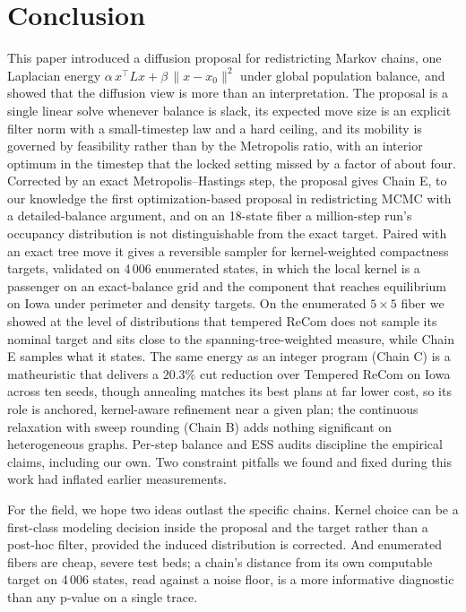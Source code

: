 \documentclass[11pt]{article}
\begin{document}
\section{Conclusion}\label{sec:conclusion}

This paper introduced a diffusion proposal for redistricting Markov
chains, one Laplacian energy
$\alpha\,x^\top L x + \beta\,\|x - x_0\|^2$ under global population
balance, and showed that the diffusion view is more than an
interpretation. The proposal is a single linear solve whenever
balance is slack, its expected move size is an explicit filter norm
with a small-timestep law and a hard ceiling, and its mobility is
governed by feasibility rather than by the Metropolis ratio, with an
interior optimum in the timestep that the locked setting missed by a
factor of about four. Corrected by an exact Metropolis--Hastings
step, the proposal gives Chain E, to our knowledge the first
optimization-based proposal in redistricting MCMC with a
detailed-balance argument, and on an 18-state fiber a million-step
run's occupancy distribution is not distinguishable from the exact
target. Paired with an exact tree move it gives a reversible sampler
for kernel-weighted compactness targets, validated on 4\,006
enumerated states, in which the local kernel is a passenger on an
exact-balance grid and the component that reaches equilibrium on
Iowa under perimeter and density targets. On the enumerated $5 \times 5$ fiber we showed at the level
of distributions that tempered ReCom does not sample its nominal
target and sits close to the spanning-tree-weighted measure, while
Chain E samples what it states. The same energy as an integer program
(Chain C) is a matheuristic that delivers a $20.3\%$ cut reduction
over Tempered ReCom on Iowa across ten seeds, though annealing
matches its best plans at far lower cost, so its role is anchored,
kernel-aware refinement near a given plan; the continuous relaxation
with sweep rounding (Chain B) adds nothing significant on
heterogeneous graphs. Per-step balance and ESS audits discipline the
empirical claims, including our own. Two constraint pitfalls we found
and fixed during this work had inflated earlier measurements.

For the field, we hope two ideas outlast the specific chains. Kernel
choice can be a first-class modeling decision inside the proposal and
the target rather than a post-hoc filter, provided the induced
distribution is corrected. And enumerated fibers are cheap, severe
test beds; a chain's distance from its own computable target on
4\,006 states, read against a noise floor, is a more informative
diagnostic than any p-value on a single trace.
\end{document}
